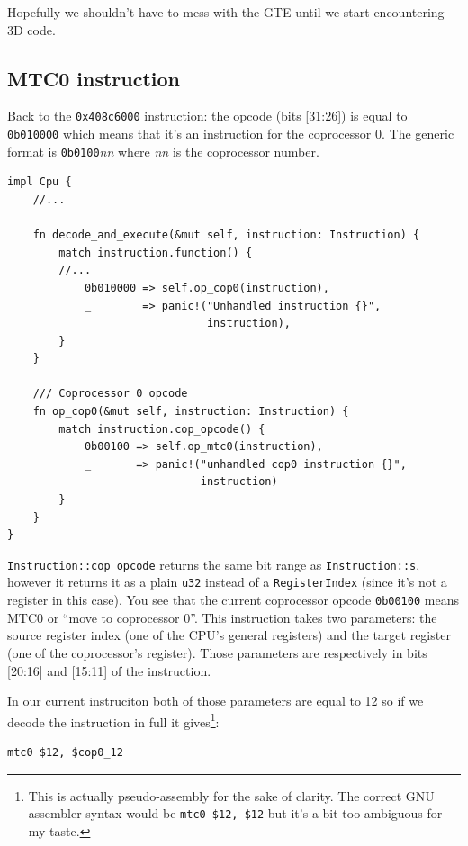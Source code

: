 \documentclass[a4paper]{article}
\newcommand{\code}[1] {\texttt{#1}}
\begin{document}
Hopefully we shouldn't have to mess with the GTE until we start
encountering 3D code.

\subsection{MTC0 instruction}

Back to the \code{0x408c6000} instruction: the opcode (bits [31:26])
is equal to \code{0b010000} which means that it's an instruction for
the coprocessor 0. The generic format is \code{0b0100}\emph{nn} where
\emph{nn} is the coprocessor number.

\begin{lstlisting}
impl Cpu {
    //...

    fn decode_and_execute(&mut self, instruction: Instruction) {
        match instruction.function() {
	    //...
            0b010000 => self.op_cop0(instruction),
            _        => panic!("Unhandled instruction {}",
                               instruction),
        }
    }

    /// Coprocessor 0 opcode
    fn op_cop0(&mut self, instruction: Instruction) {
        match instruction.cop_opcode() {
            0b00100 => self.op_mtc0(instruction),
            _       => panic!("unhandled cop0 instruction {}",
                              instruction)
        }
    }
}
\end{lstlisting}

\code{Instruction::cop\_opcode} returns the same bit range as
\code{Instruction::s}, however it returns it as a plain \code{u32}
instead of a \code{RegisterIndex} (since it's not a register in this
case). You see that the current coprocessor opcode \code{0b00100} means
MTC0 or ``move to coprocessor 0''. This instruction takes two
parameters: the source register index (one of the CPU's general
registers) and the target register (one of the coprocessor's
register). Those parameters are respectively in bits [20:16] and
[15:11] of the instruction.

In our current instruciton both of those parameters are equal to 12 so
if we decode the instruction in full it gives\footnote{This is
  actually pseudo-assembly for the sake of clarity. The correct GNU
  assembler syntax would be \mbox{\code{mtc0 \$12, \$12}} but it's a
bit too ambiguous for my taste.}:

\begin{lstlisting}[language=assembly]
mtc0 $12, $cop0_12
\end{lstlisting}
\end{document}
